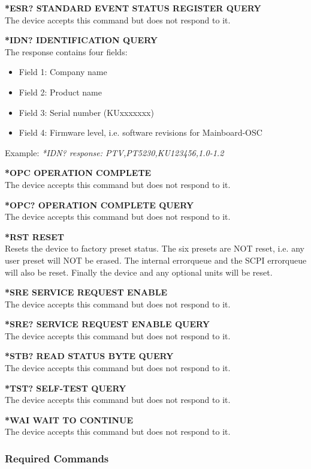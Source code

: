\textbf{*ESR? STANDARD EVENT STATUS REGISTER QUERY}\\
The device accepts this command but does not respond to it.

\textbf{*IDN? IDENTIFICATION QUERY}\\
The response contains four fields:
\begin{itemize}
\item Field 1: Company name
\item Field 2: Product name
\item Field 3: Serial number (KUxxxxxxx)
\item Field 4: Firmware level, i.e. software revisions for Mainboard-OSC
\end{itemize}

Example:
\textit{*IDN? response: PTV,PT5230,KU123456,1.0-1.2}

\textbf{*OPC OPERATION COMPLETE}\\
The device accepts this command but does not respond to it.

\textbf{*OPC? OPERATION COMPLETE QUERY}\\
The device accepts this command but does not respond to it.

\textbf{*RST RESET}\\
Resets the device to factory preset status. The six presets are NOT reset, i.e. any user preset will NOT be erased. The internal errorqueue and the SCPI errorqueue will also be reset. Finally the device and any optional units will be reset.

\textbf{*SRE SERVICE REQUEST ENABLE}\\
The device accepts this command but does not respond to it.

\textbf{*SRE? SERVICE REQUEST ENABLE QUERY}\\
The device accepts this command but does not respond to it.

\textbf{*STB? READ STATUS BYTE QUERY}\\
The device accepts this command but does not respond to it.

\textbf{*TST? SELF-TEST QUERY}\\
The device accepts this command but does not respond to it.

\textbf{*WAI WAIT TO CONTINUE}\\
The device accepts this command but does not respond to it.

\subsubsection{Required Commands}

